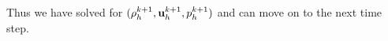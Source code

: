 \documentclass[letterpaper]{erdc}
\begin{document}
Thus we have solved for $(\rho_h^{k+1}, \textbf{u}_h^{k+1}, p_h^{k+1})$ and can move on to the next time step.

%
%
%
\end{document}
